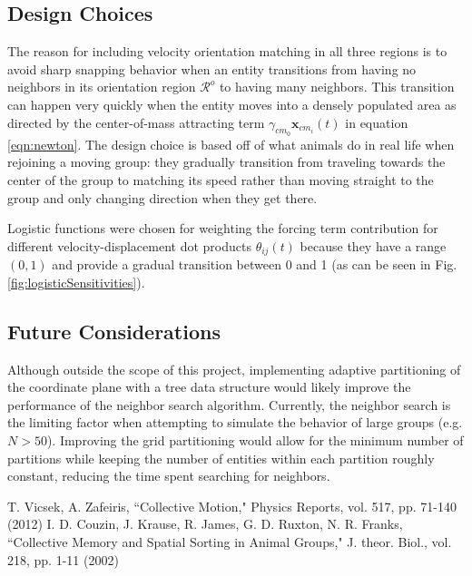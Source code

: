 \documentclass[conference]{IEEEtran}
\begin{document}
\subsection{Design Choices}
The reason for including velocity orientation matching in all three regions is to avoid sharp snapping behavior when an entity transitions from having no neighbors in its orientation region $\mathcal{R}^o$ to having many neighbors.
This transition can happen very quickly when the entity moves into a densely populated area as directed by the center-of-mass attracting term $\gamma_{cm_0}\mathbf{x}_{cm_i}(t)$ in equation \ref{eqn:newton}.
The design choice is based off of what animals do in real life when rejoining a moving group: they gradually transition from traveling towards the center of the group to matching its speed rather than moving straight to the group and only changing direction when they get there.

Logistic functions were chosen for weighting the forcing term contribution for different velocity-displacement dot products $\theta_{ij}(t)$ because they have a range $(0,1)$ and provide a gradual transition between 0 and 1 (as can be seen in Fig. \ref{fig:logisticSensitivities}).

\subsection{Future Considerations}
Although outside the scope of this project, implementing adaptive partitioning of the coordinate plane with a tree data structure would likely improve the performance of the neighbor search algorithm.
Currently, the neighbor search is the limiting factor when attempting to simulate the behavior of large groups (e.g. $N > 50$).
Improving the grid partitioning would allow for the minimum number of partitions while keeping the number of entities within each partition roughly constant, reducing the time spent searching for neighbors.

\begin{thebibliography}{00}
     T. Vicsek, A. Zafeiris, ``Collective Motion," Physics Reports, vol. 517, pp. 71-140 (2012)
     I. D. Couzin, J. Krause, R. James, G. D. Ruxton, N. R. Franks, ``Collective Memory and Spatial Sorting in Animal Groups," J. theor. Biol., vol. 218, pp. 1-11 (2002)
\end{thebibliography}
\end{document}
